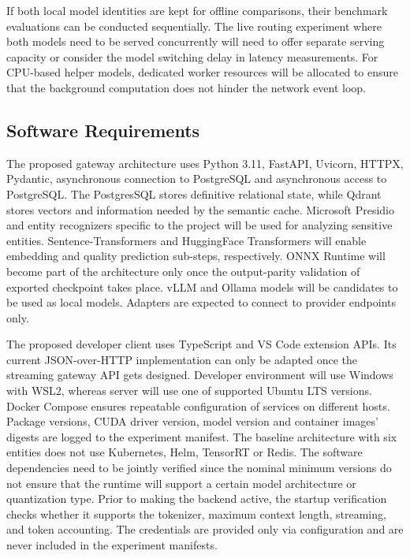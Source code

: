 \documentclass{FastFyp}
\begin{document}
If both local model identities are kept for offline comparisons, their benchmark evaluations can be conducted sequentially. The live routing experiment where both models need to be served concurrently will need to offer separate serving capacity or consider the model switching delay in latency measurements. For CPU-based helper models, dedicated worker resources will be allocated to ensure that the background computation does not hinder the network event loop.

\subsection{Software Requirements}
\label{subsec:software-reqs}
The proposed gateway architecture uses Python 3.11, FastAPI, Uvicorn, HTTPX,
Pydantic, asynchronous connection to PostgreSQL and asynchronous access to
PostgreSQL. The PostgresSQL stores definitive relational state, while Qdrant
stores vectors and information needed by the semantic cache. Microsoft Presidio and
entity recognizers specific to the project will be used for analyzing sensitive
entities. Sentence-Transformers and HuggingFace Transformers will enable embedding
and quality prediction sub-steps, respectively. ONNX Runtime will become part of the
architecture only once the output-parity validation of exported checkpoint takes
place. vLLM and Ollama models will be candidates to be used as local models.
Adapters are expected to connect to provider endpoints only.

The proposed developer client uses TypeScript and VS Code extension APIs. Its current
JSON-over-HTTP implementation can only be adapted once the streaming gateway API
gets designed. Developer environment will use Windows with WSL2, whereas server will
use one of supported Ubuntu LTS versions. Docker Compose ensures repeatable
configuration of services on different hosts. Package versions, CUDA driver version,
model version and container images' digests are logged to the experiment manifest.
The baseline architecture with six entities does not use Kubernetes, Helm,
TensorRT or Redis.
The software dependencies need to be jointly verified since the nominal minimum
versions do not ensure that the runtime will support a certain model
architecture or quantization type. Prior to making the backend active, the
startup verification checks whether it supports the tokenizer, maximum
context length, streaming, and token accounting. The credentials are provided
only via configuration and are never included in the experiment manifests.
\end{document}
